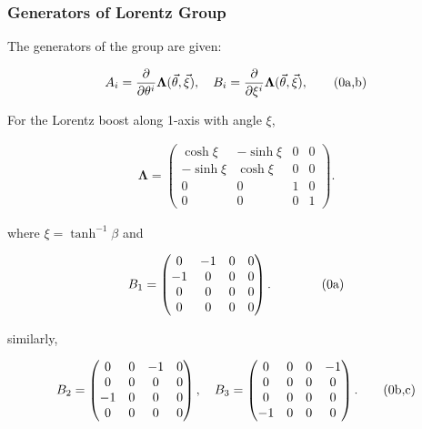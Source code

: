\documentclass[12pt]{beamer}
\newcommand{\stag}[1]{\tag{\arabic{equation}#1}}
\begin{document}
\begin{frame}
\frametitle{Generators of Lorentz Group}

The generators of the group are given:

\begin{align}
A_i=\frac{\partial}{\partial\theta^i}\bm{\Lambda}(\vec{\theta},\vec{\xi}),~~~B_i=\frac{\partial}{\partial\xi^i}\bm{\Lambda}(\vec{\theta},\vec{\xi}),\stag{a,b}
\end{align}

For the Lorentz boost along 1-axis with angle $ \xi $,

\begin{align}
\bm{\Lambda}=\begin{pmatrix}
\cosh\xi&-\sinh\xi&0&0\\
-\sinh\xi&\cosh\xi&0&0\\
0&0&1&0\\
0&0&0&1\end{pmatrix}.
\end{align}

\noindent where $ \xi=\tanh^{-1}\beta $ and
\end{frame}

\begin{frame}
\addtocounter{equation}{1}
\begin{align*}
B_1=\begin{pmatrix}
0&-1&0&0\\
-1&0&0&0\\
0&0&0&0\\
0&0&0&0\end{pmatrix}.~~~~~~\stag{a}
\end{align*}

\noindent similarly,

\begin{align*}
B_2=\begin{pmatrix}
0&0&-1&0\\
0&0&0&0\\
-1&0&0&0\\
0&0&0&0\end{pmatrix},~~~
B_3=\begin{pmatrix}
0&0&0&-1\\
0&0&0&0\\
0&0&0&0\\
-1&0&0&0\end{pmatrix}.\stag{b,c}
\end{align*}
\end{frame}
\end{document}
